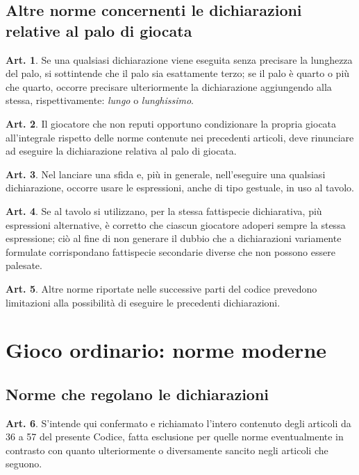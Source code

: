 \documentclass[italian,a4paper]{article}
\theoremstyle{definition}
\newtheorem{art}{Art.}
\begin{document}
\subsection*{Altre norme concernenti le dichiarazioni relative al palo di giocata}

\begin{art}
Se una qualsiasi dichiarazione viene eseguita senza precisare la lunghezza
del palo, si sottintende che il palo sia esattamente terzo; se il palo è
quarto o più che quarto, occorre precisare ulteriormente la dichiarazione
aggiungendo alla stessa, rispettivamente: \emph{lungo} o  \emph{lunghissimo}.
\end{art}

\begin{art}
Il giocatore che non reputi opportuno condizionare la propria giocata
all’integrale rispetto delle norme contenute nei precedenti articoli, deve
rinunciare ad eseguire la dichiarazione relativa al palo di giocata.
\end{art}

\begin{art}
Nel lanciare una sfida e, più in generale, nell’eseguire una qualsiasi
dichiarazione, occorre usare le espressioni, anche di tipo gestuale, in uso
al tavolo.
\end{art}

\begin{art}
Se al tavolo si utilizzano, per la stessa fattispecie dichiarativa, più
espressioni alternative, è corretto che ciascun giocatore adoperi sempre la
stessa espressione; ciò al fine di non generare il dubbio che a
dichiarazioni variamente formulate corrispondano fattispecie secondarie
diverse che non possono essere palesate.
\end{art}

\begin{art}
Altre norme riportate nelle successive parti del codice prevedono
limitazioni alla possibilità di eseguire le precedenti dichiarazioni.
\end{art}

\section*{Gioco ordinario: norme moderne}
\subsection*{Norme che regolano le dichiarazioni}
\setcounter{art}{145}
\begin{art}
S’intende qui confermato e richiamato l’intero contenuto degli articoli da
36 a 57 del presente Codice, fatta esclusione per quelle norme eventualmente
in contrasto con quanto ulteriormente o diversamente sancito negli articoli
che seguono.
\end{art}
\end{document}
